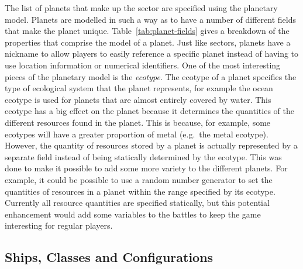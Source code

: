 The list of planets that make up the sector are specified using the planetary model. Planets are modelled in such a way as to have a number of different fields that make the planet unique. Table~\ref{tab:planet-fields} gives a breakdown of the properties that comprise the model of a planet. Just like sectors, planets have a nickname to allow players to easily reference a specific planet instead of having to use location information or numerical identifiers. One of the most interesting pieces of the planetary model is the \emph{ecotype}. The ecotype of a planet specifies the type of ecological system that the planet represents, for example the ocean ecotype is used for planets that are almost entirely covered by water. This ecotype has a big effect on the planet because it determines the quantities of the different resources found in the planet. This is because, for example, some ecotypes will have a greater proportion of metal (e.g.\ the metal ecotype). However, the quantity of resources stored by a planet is actually represented by a separate field instead of being statically determined by the ecotype. This was done to make it possible to add some more variety to the different planets. For example, it could be possible to use a random number generator to set the quantities of resources in a planet within the range specified by its ecotype. Currently all resource quantities are specified statically, but this potential enhancement would add some variables to the battles to keep the game interesting for regular players.

% 
% 

\subsection{Ships, Classes and Configurations}

